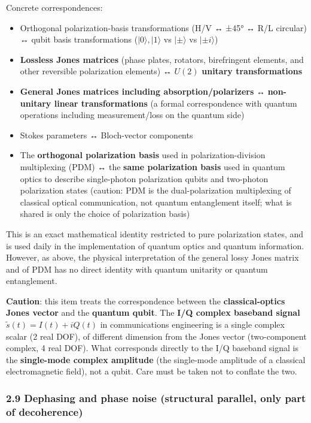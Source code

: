 \documentclass[
]{article}
\providecommand{\tightlist}{%
  \setlength{\itemsep}{0pt}\setlength{\parskip}{0pt}}
\begin{document}
Concrete correspondences:

\begin{itemize}
\tightlist
\item
  Orthogonal polarization-basis transformations (H/V ↔ ±45° ↔ R/L
  circular) ↔ qubit basis transformations (\(|0\rangle,|1\rangle\) vs
  \(|\pm\rangle\) vs \(|\pm i\rangle\))
\item
  \textbf{Lossless Jones matrices} (phase plates, rotators, birefringent
  elements, and other reversible polarization elements) ↔ \(U(2)\)
  \textbf{unitary transformations}
\item
  \textbf{General Jones matrices including absorption/polarizers} ↔
  \textbf{non-unitary linear transformations} (a formal correspondence
  with quantum operations including measurement/loss on the quantum
  side)
\item
  Stokes parameters ↔ Bloch-vector components
\item
  The \textbf{orthogonal polarization basis} used in
  polarization-division multiplexing (PDM) ↔ the \textbf{same
  polarization basis} used in quantum optics to describe single-photon
  polarization qubits and two-photon polarization states (caution: PDM
  is the dual-polarization multiplexing of classical optical
  communication, not quantum entanglement itself; what is shared is only
  the choice of polarization basis)
\end{itemize}

This is an exact mathematical identity restricted to pure polarization
states, and is used daily in the implementation of quantum optics and
quantum information. However, as above, the physical interpretation of
the general lossy Jones matrix and of PDM has no direct identity with
quantum unitarity or quantum entanglement.

\textbf{Caution}: this item treats the correspondence between the
\textbf{classical-optics Jones vector} and the \textbf{quantum qubit}.
The \textbf{I/Q complex baseband signal} \(\tilde{s}(t)=I(t)+iQ(t)\) in
communications engineering is a single complex scalar (2 real DOF), of
different dimension from the Jones vector (two-component complex, 4 real
DOF). What corresponds directly to the I/Q baseband signal is the
\textbf{single-mode complex amplitude} (the single-mode amplitude of a
classical electromagnetic field), not a qubit. Care must be taken not to
conflate the two.

\subsubsection{2.9 Dephasing and phase noise (structural parallel, only
part of
decoherence)}\label{dephasing-and-phase-noise-structural-parallel-only-part-of-decoherence}
\end{document}
